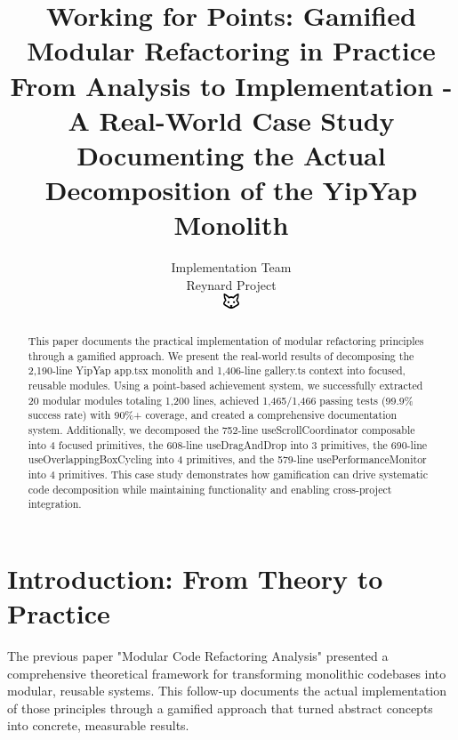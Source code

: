 \documentclass[11pt]{article}
\begin{document}
\title{\textbf{Working for Points: Gamified Modular Refactoring in Practice} \\
\Large{From Analysis to Implementation - A Real-World Case Study} \\
\large{Documenting the Actual Decomposition of the YipYap Monolith}}

\author{Implementation Team\\
Reynard Project\\
\includegraphics[width=0.5cm]{favicon.pdf}}

\maketitle

\begin{abstract}
This paper documents the practical implementation of modular refactoring principles through a gamified approach. We present the real-world results of decomposing the 2,190-line YipYap app.tsx monolith and 1,406-line gallery.ts context into focused, reusable modules. Using a point-based achievement system, we successfully extracted 20 modular modules totaling 1,200 lines, achieved 1,465/1,466 passing tests (99.9\% success rate) with 90\%+ coverage, and created a comprehensive documentation system. Additionally, we decomposed the 752-line useScrollCoordinator composable into 4 focused primitives, the 608-line useDragAndDrop into 3 primitives, the 690-line useOverlappingBoxCycling into 4 primitives, and the 579-line usePerformanceMonitor into 4 primitives. This case study demonstrates how gamification can drive systematic code decomposition while maintaining functionality and enabling cross-project integration.
\end{abstract}

\tableofcontents
\newpage

\section{Introduction: From Theory to Practice}

The previous paper "Modular Code Refactoring Analysis" presented a comprehensive theoretical framework for transforming monolithic codebases into modular, reusable systems. This follow-up documents the actual implementation of those principles through a gamified approach that turned abstract concepts into concrete, measurable results.
\end{document}

